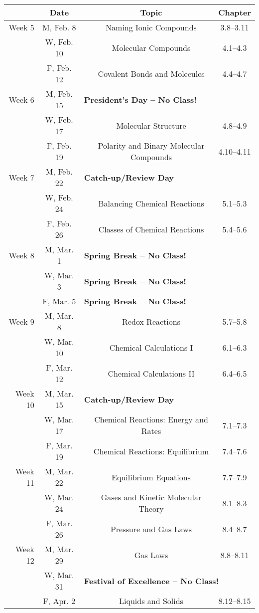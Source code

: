 \documentclass[12pt, letterpaper]{article}
\begin{document}
\noindent
\begin{tabular}{rcccc}
& Date && Topic & Chapter\\
	\midrule
	Week 5 & M, Feb. 8&& Naming Ionic Compounds & 3.8--3.11\\
	& W, Feb. 10&& Molecular Compounds & 4.1--4.3\\
	& F, Feb. 12&& Covalent Bonds and Molecules & 4.4--4.7\\
	\midrule
	Week 6 & M, Feb. 15& \multicolumn{3}{l}{\textbf{President's Day -- No Class!}}\\
	& W, Feb. 17&& Molecular Structure & 4.8--4.9\\
	& F, Feb. 19&& Polarity and Binary Molecular Compounds & 4.10--4.11\\
	\midrule
	Week 7 & M, Feb. 22& \multicolumn{3}{l}{\textbf{Catch-up/Review Day}}\\
	& W, Feb. 24&& Balancing Chemical Reactions & 5.1--5.3\\
	& F, Feb. 26&& Classes of Chemical Reactions & 5.4--5.6\\
	\midrule
	Week 8 & M, Mar. 1& \multicolumn{3}{l}{\textbf{Spring Break -- No Class!}}\\
	& W, Mar. 3& \multicolumn{3}{l}{\textbf{Spring Break -- No Class!}}\\
	& F, Mar. 5& \multicolumn{3}{l}{\textbf{Spring Break -- No Class!}}\\
	\midrule
	Week 9 & M, Mar. 8&& Redox Reactions & 5.7--5.8\\
	& W, Mar. 10&& Chemical Calculations I & 6.1--6.3\\
	& F, Mar. 12&& Chemical Calculations II & 6.4--6.5\\
	\midrule
	Week 10 & M, Mar. 15& \multicolumn{3}{l}{\textbf{Catch-up/Review Day}}\\
	& W, Mar. 17&& Chemical Reactions: Energy and Rates & 7.1--7.3\\
	& F, Mar. 19&& Chemical Reactions: Equilibrium & 7.4--7.6\\
	\midrule
	Week 11 & M, Mar. 22&& Equilibrium Equations & 7.7--7.9\\
	& W, Mar. 24&& Gases and Kinetic Molecular Theory & 8.1--8.3\\
	& F, Mar. 26&& Pressure and Gas Laws & 8.4--8.7\\
	\midrule
	Week 12 & M, Mar. 29&& Gas Laws & 8.8--8.11\\
	& W, Mar. 31& \multicolumn{3}{l}{\textbf{Festival of Excellence -- No Class!}}\\
	& F, Apr. 2&& Liquids and Solids & 8.12--8.15\\
\end{tabular}
\end{document}

